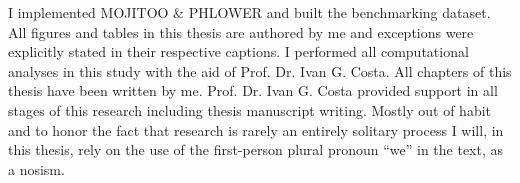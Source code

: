 I implemented MOJITOO \& PHLOWER and built the benchmarking dataset. All figures and tables in this thesis are authored by me and exceptions were explicitly stated in their respective captions. I performed all computational analyses in this study with the aid of Prof. Dr. Ivan G. Costa. All chapters of this thesis have been written by me. Prof. Dr. Ivan G. Costa provided support in all stages of this research including thesis manuscript writing. Mostly out of habit and to honor the fact that research is rarely an entirely solitary process I will, in this thesis, rely on the use of the first-person plural pronoun ``we'' in the text, as a nosism.





